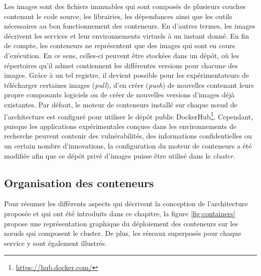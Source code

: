 Les images sont des fichiers immuables qui sont composés de plusieurs couches contenant le code source, les librairies, les dépendances ainsi que les outils nécessaires au bon fonctionnement des conteneurs. En d'autres termes, les images décrivent les services et leur environnements virtuels à un instant donné. En fin de compte, les conteneurs ne représentent que des images qui sont en cours d'exécution. En ce sens, celles-ci peuvent être stockées dans un dépôt, où les répertoires qu'il admet contiennent les différentes versions pour chacune des images. Grâce à un tel registre, il devient possible pour les expérimentateurs de télécharger certaines images (\textit{pull}), d'en créer (\textit{push}) de nouvelles contenant leurs propre composants logiciels ou de créer de nouvelles versions d'images déjà existantes. Par défaut, le moteur de conteneurs installé sur chaque n\oe{}ud de l'architecture est configuré pour utiliser le dépôt public DockerHub\footnote{\url{https://hub.docker.com/}}. Cependant, puisque les applications expérimentales conçues dans les environnements de recherche peuvent contenir des vulnérabilités, des informations confidentielles ou un certain nombre d'innovations, la configuration du moteur de conteneurs a été modifiée afin que ce dépôt privé d'images puisse être utilisé dans le \textit{cluster}.

\subsection{Organisation des conteneurs}
\label{sec:cont_org}

Pour résumer les différents aspects qui décrivent la conception de l'architecture proposée et qui ont été introduits dans ce chapitre, la figure \ref{fig:containers} propose une représentation graphique du déploiement des conteneurs sur les n\oe{}uds qui composent le cluster. De plus, les réseaux superposés pour chaque service y sont également illustrés.

